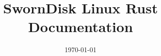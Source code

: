 \documentclass{article}
\title{SwornDisk Linux Rust Documentation}
\date{\today}
\begin{document}
  \begin{titlepage}
  \maketitle
  \end{titlepage}

  \tableofcontents
  \clearpage

  
  
  
  
  
\end{document}
